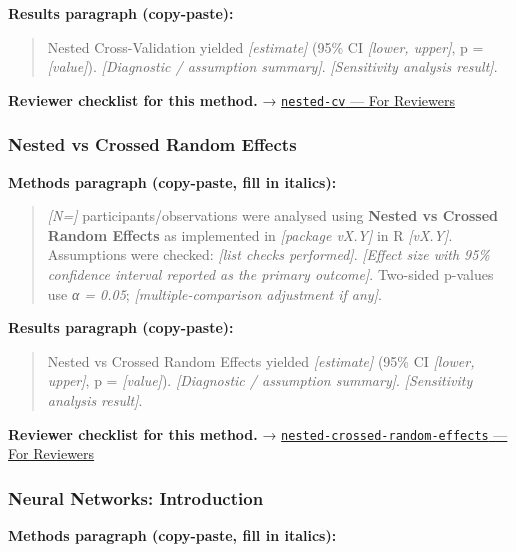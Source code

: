 \documentclass[
]{article}
\begin{document}
\textbf{Results paragraph (copy-paste):}

\begin{quote}
Nested Cross-Validation yielded \emph{{[}estimate{]}} (95\% CI
\emph{{[}lower, upper{]}}, p = \emph{{[}value{]}}). \emph{{[}Diagnostic
/ assumption summary{]}}. \emph{{[}Sensitivity analysis result{]}}.
\end{quote}

\textbf{Reviewer checklist for this method.} →
\href{../chapters/13-ml/nested-cv.Rmd\#for-reviewers}{\texttt{nested-cv}
--- For Reviewers}

\subsubsection{Nested vs Crossed Random
Effects}\label{nested-vs-crossed-random-effects}

\textbf{Methods paragraph (copy-paste, fill in italics):}

\begin{quote}
\emph{{[}N={]}} participants/observations were analysed using
\textbf{Nested vs Crossed Random Effects} as implemented in
\emph{{[}package vX.Y{]}} in R \emph{{[}vX.Y{]}}. Assumptions were
checked: \emph{{[}list checks performed{]}}. \emph{{[}Effect size with
95\% confidence interval reported as the primary outcome{]}}. Two-sided
p-values use \emph{α = 0.05}; \emph{{[}multiple-comparison adjustment if
any{]}}.
\end{quote}

\textbf{Results paragraph (copy-paste):}

\begin{quote}
Nested vs Crossed Random Effects yielded \emph{{[}estimate{]}} (95\% CI
\emph{{[}lower, upper{]}}, p = \emph{{[}value{]}}). \emph{{[}Diagnostic
/ assumption summary{]}}. \emph{{[}Sensitivity analysis result{]}}.
\end{quote}

\textbf{Reviewer checklist for this method.} →
\href{../chapters/07-regression/nested-crossed-random-effects.Rmd\#for-reviewers}{\texttt{nested-crossed-random-effects}
--- For Reviewers}

\subsubsection{Neural Networks:
Introduction}\label{neural-networks-introduction}

\textbf{Methods paragraph (copy-paste, fill in italics):}
\end{document}
